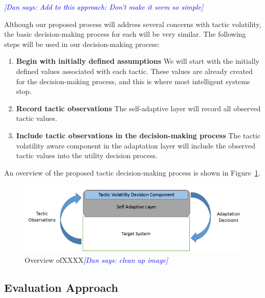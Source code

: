 \documentclass{article}
\newcommand{\dan}[1]{\textcolor{blue}{{\it [Dan says: #1]}}}
\begin{document}
\dan{Add to this approach: Don't make it seem so simple}


Although our proposed process will address several concerns with tactic volatility, the basic decision-making process for each will be very similar. The following steps will be used in our decision-making process:


\begin{enumerate}[noitemsep]
	\item \textbf{Begin with initially defined assumptions} We will start with the initially defined values associated with each tactic. These values are already created for the decision-making process, and this is where most intelligent systems stop.

	\item \textbf{Record tactic observations} The self-adaptive layer will record all observed tactic values.
	\item \textbf{Include tactic observations in the decision-making process} The tactic volatility aware component in the adaptation layer will include the observed tactic values into the utility decision process.%
\end{enumerate}



An overview of the proposed tactic decision-making process is shown in Figure~\ref{fig:procOverview}.


\begin{figure}[h]
	\centering
    \includegraphics[scale=0.6]{images/TacticVolatilityProcess.png}
    \caption{Overview ofXXXX\dan{clean up image}}
    \label{fig:procOverview}
\end{figure}


\subsection{Evaluation Approach}
\end{document}
